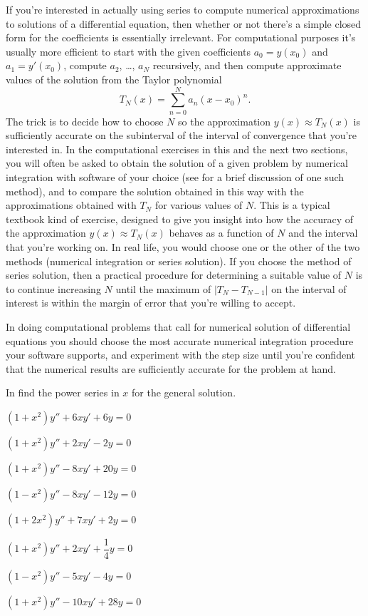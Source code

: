 If you're interested in actually using series to compute numerical
approximations to solutions of a differential equation, then whether
or not there's a simple closed form for the coefficients is
essentially irrelevant. For computational purposes it's usually
more efficient to start with the given coefficients $a_0=y(x_0)$ and
$a_1=y'(x_0)$, compute $a_2$, \dots, $a_N$ recursively,
 and then compute approximate values of the solution from the
Taylor polynomial
\[
T_N(x)=\sum_{n=0}^Na_n(x-x_0)^n.
\]
The trick is to decide how to choose $N$ so the approximation
$y(x)\approx T_N(x)$ is sufficiently accurate on the subinterval of
the interval of convergence that you're interested in. In the
computational exercises in this  and the next two sections,
you will often be asked to obtain the solution of a given problem by
numerical integration with  software  of your choice (see
 for a brief discussion of one such method),
and to compare the solution obtained in this way with the
approximations obtained with $T_N$ for various values of $N$. This is
a typical textbook kind of exercise, designed to give you insight into
how the accuracy of the approximation $y(x)\approx T_N(x)$ behaves as
a function of $N$ and the interval that you're working on. In real
life, you would choose one or the other of the two methods (numerical
integration or series solution). If you choose the method of series
solution, then a practical procedure for determining a suitable value
of $N$ is to continue increasing $N$ until the maximum of
$|T_N-T_{N-1}|$ on the interval of interest is within the margin of
error that you're willing to accept.

In doing computational problems  that call for
numerical solution of differential equations you should
choose the most accurate numerical integration procedure  your
software  supports, and experiment with the step size until
you're confident that the numerical results are sufficiently
accurate for the problem at hand.


\exercises
 In   find the power
series in $x$ for the general solution.

\begin{exerciselistTwoColumn}
\item\label{exer:7.2.1}$(1+x^2)y''+6xy'+6y=0$
\item\label{exer:7.2.2}$(1+x^2)y''+2xy'-2y=0$
\item\label{exer:7.2.3}$(1+x^2)y''-8xy'+20y=0$
\item\label{exer:7.2.4}$(1-x^2)y''-8xy'-12y=0$
\item\label{exer:7.2.5}$(1+2x^2)y''+7xy'+2y=0$
\item\label{exer:7.2.6}$(1+x^2)y''+2xy'+\dfrac{1}{4}y=0$
\item\label{exer:7.2.7}$(1-x^2)y''-5xy'-4y=0$
\item\label{exer:7.2.8}$(1+x^2)y''-10xy'+28y=0$
\end{exerciselistTwoColumn}

